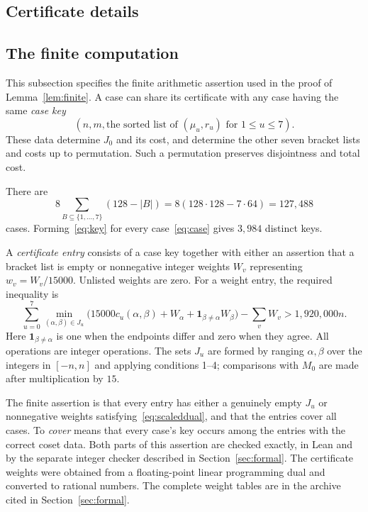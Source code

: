 \documentclass[11pt]{article}
\theoremstyle{definition}
\begin{document}
\begin{appendices}
\section{Certificate details}\label{app:certificates}
\subsection{The finite computation}
This subsection specifies the finite arithmetic assertion used in the
proof of Lemma~\ref{lem:finite}.
A case can share its certificate with any case having the same
\emph{case key}
\begin{equation}\label{eq:key}
 \left(n,m,\text{the sorted list of }(\mu_u,r_u)\text{ for }1\leq u\leq7\right).
\end{equation}
These data determine $J_0$ and its cost, and determine the other seven
bracket lists and costs up to permutation. Such a permutation preserves
disjointness and total cost.

There are
\[
 8\sum_{B\subseteq\{1,\ldots,7\}}(128-|B|)
 =8(128\cdot128-7\cdot64)=127{,}488
\]
cases.
Forming~\eqref{eq:key} for every
case~\eqref{eq:case} gives $3{,}984$ distinct keys.

A \emph{certificate entry} consists of a case key together with either
an assertion that a bracket list is empty or nonnegative integer weights
$W_v$ representing $w_v=W_v/15000$. Unlisted weights are zero.
For a weight entry, the required inequality is
\begin{equation}\label{eq:scaleddual}
 \sum_{u=0}^7\min_{(\alpha,\beta)\in J_u}
 \bigl(15000c_u(\alpha,\beta)+W_\alpha+
                  \mathbf1_{\beta\ne\alpha}W_\beta\bigr)
       -\sum_v W_v > 1{,}920{,}000n.
\end{equation}
Here $\mathbf1_{\beta\ne\alpha}$ is one when the endpoints differ and
zero when they agree. All operations are integer operations.
The sets $J_u$ are formed by ranging $\alpha,\beta$ over the integers
in $[-n,n]$ and applying conditions 1--4; comparisons with
$M_0$ are made after multiplication by $15$.

The finite assertion is that every
entry has either a genuinely empty $J_u$ or nonnegative weights
satisfying~\eqref{eq:scaleddual}, and that the entries cover all cases.
To \emph{cover} means that every case's key occurs among the entries
with the correct coset data. Both parts of this assertion are checked
exactly, in Lean and by the separate integer checker described in
Section~\ref{sec:formal}.
The certificate weights were obtained from a floating-point linear
programming dual and converted to rational numbers. The complete weight
tables are in the archive cited in Section~\ref{sec:formal}.


\end{appendices}
\end{document}
